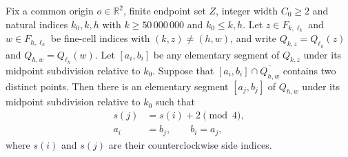 \begin{lemma}
    \label{thm:area_law_actual_elementary_side_matching}
    \leanok
    Fix a common origin $o\in\mathbb R^2$, finite endpoint set $Z$,
    integer width $C_0\ge2$ and natural indices $k_0,k,h$ with
    $k\ge50\,000\,000$ and $k_0\le k,h$.
    Let $z\in F_{k,\ell_k}$ and $w\in F_{h,\ell_h}$ be
    fine-cell indices with $(k,z)\ne(h,w)$, and write
    $Q_{k,z}=Q_{\ell_k}(z)$ and $Q_{h,w}=Q_{\ell_h}(w)$.
    Let $[a_i,b_i]$ be any elementary segment of $Q_{k,z}$
    under its midpoint subdivision relative to $k_0$.
    Suppose that
    $[a_i,b_i]\cap\overline{Q_{h,w}}$ contains two distinct points.
    Then there is an elementary segment $[a_j,b_j]$ of $Q_{h,w}$
    under its midpoint subdivision relative to $k_0$
    such that
    \begin{align}
        s(j) & =s(i)+2\pmod4,       \\
        a_i  & =b_j,\qquad b_i=a_j,
    \end{align}
    where $s(i)$ and $s(j)$ are their counterclockwise side indices.
\end{lemma}
